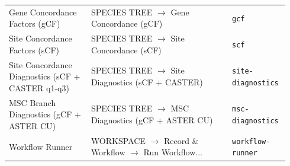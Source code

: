 \documentclass[11pt]{report}
\begin{document}
\begin{longtable}{@{}p{0.28\linewidth}p{0.48\linewidth}p{0.18\linewidth}@{}}
Gene Concordance Factors (gCF) & SPECIES TREE $\rightarrow$ Gene Concordance (gCF) & \texttt{gcf} \\
Site Concordance Factors (sCF) & SPECIES TREE $\rightarrow$ Site Concordance (sCF) & \texttt{scf} \\
Site Concordance Diagnostics (sCF + CASTER q1-q3) & SPECIES TREE $\rightarrow$ Site Diagnostics (sCF + CASTER) & \texttt{site-diagnostics} \\
MSC Branch Diagnostics (gCF + ASTER CU) & SPECIES TREE $\rightarrow$ MSC Diagnostics (gCF + ASTER CU) & \texttt{msc-diagnostics} \\
Workflow Runner & WORKSPACE $\rightarrow$ Record \& Workflow $\rightarrow$ Run Workflow... & \texttt{workflow-runner} \\
\bottomrule
\end{longtable}
\end{document}
